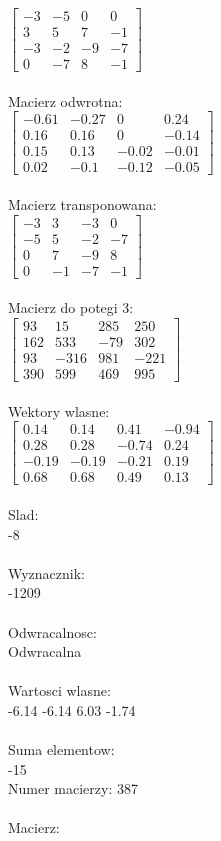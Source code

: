 \documentclass[a4paper,12pt]{article}
\begin{document}
$\begin{bmatrix} -3&-5&0&0\\3&5&7&-1\\-3&-2&-9&-7\\0&-7&8&-1 \end{bmatrix}$
\\
\\
Macierz odwrotna:\\

$\begin{bmatrix} -0.61&-0.27&0&0.24\\0.16&0.16&0&-0.14\\0.15&0.13&-0.02&-0.01\\0.02&-0.1&-0.12&-0.05 \end{bmatrix}$
\\
\\
Macierz transponowana:\\

$\begin{bmatrix} -3&3&-3&0\\-5&5&-2&-7\\0&7&-9&8\\0&-1&-7&-1 \end{bmatrix}$
\\
\\
Macierz do potegi 3:\\

$\begin{bmatrix} 93&15&285&250\\162&533&-79&302\\93&-316&981&-221\\390&599&469&995 \end{bmatrix}$
\\
\\
Wektory wlasne:\\

$\begin{bmatrix} 0.14&0.14&0.41&-0.94\\0.28&0.28&-0.74&0.24\\-0.19&-0.19&-0.21&0.19\\0.68&0.68&0.49&0.13 \end{bmatrix}$
\\
\\
Slad:\\
-8
\\
\\
Wyznacznik:\\
-1209
\\
\\
Odwracalnosc:\\
Odwracalna
\\
\\
Wartosci wlasne:\\
-6.14 -6.14 6.03 -1.74
\\
\\
Suma elementow:\\
-15
\\
\newpage
Numer macierzy:
387
\\
\\
Macierz:\\
\end{document}
